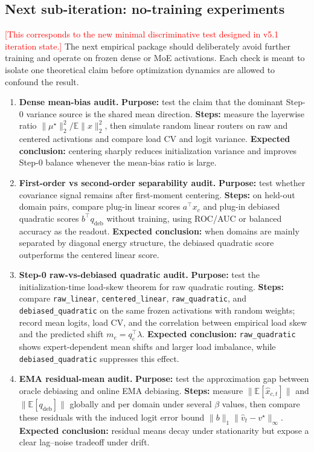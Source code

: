\documentclass[11pt]{article}
\newcommand{\idea}[1]{\textcolor{red}{[#1]}}
\begin{document}
\subsection{Next sub-iteration: no-training experiments}
\idea{This corresponds to the new minimal discriminative test designed in v5.1 iteration state.}
The next empirical package should deliberately avoid further training and operate on frozen dense or MoE activations. Each check is meant to isolate one theoretical claim before optimization dynamics are allowed to confound the result.
\begin{enumerate}
    \item \textbf{Dense mean-bias audit.} \textbf{Purpose:} test the claim that the dominant Step-0 variance source is the shared mean direction. \textbf{Steps:} measure the layerwise ratio $\|\mu^\star\|_2^2/\mathbb E\|x\|_2^2$, then simulate random linear routers on raw and centered activations and compare load CV and logit variance. \textbf{Expected conclusion:} centering sharply reduces initialization variance and improves Step-0 balance whenever the mean-bias ratio is large.
    \item \textbf{First-order vs second-order separability audit.} \textbf{Purpose:} test whether covariance signal remains after first-moment centering. \textbf{Steps:} on held-out domain pairs, compare plug-in linear scores $a^\top x_c$ and plug-in debiased quadratic scores $b^\top q_{\mathrm{deb}}$ without training, using ROC/AUC or balanced accuracy as the readout. \textbf{Expected conclusion:} when domains are mainly separated by diagonal energy structure, the debiased quadratic score outperforms the centered linear score.
    \item \textbf{Step-0 raw-vs-debiased quadratic audit.} \textbf{Purpose:} test the initialization-time load-skew theorem for raw quadratic routing. \textbf{Steps:} compare \texttt{raw\_linear}, \texttt{centered\_linear}, \texttt{raw\_quadratic}, and \texttt{debiased\_quadratic} on the same frozen activations with random weights; record mean logits, load CV, and the correlation between empirical load skew and the predicted shift $m_e=q_e^\top \lambda$. \textbf{Expected conclusion:} \texttt{raw\_quadratic} shows expert-dependent mean shifts and larger load imbalance, while \texttt{debiased\_quadratic} suppresses this effect.
    \item \textbf{EMA residual-mean audit.} \textbf{Purpose:} test the approximation gap between oracle debiasing and online EMA debiasing. \textbf{Steps:} measure $\|\mathbb E[\hat x_{c,t}]\|$ and $\|\mathbb E[q_{\mathrm{deb}}]\|$ globally and per domain under several $\beta$ values, then compare these residuals with the induced logit error bound $\|b\|_1\|\hat v_t-v^\star\|_\infty$. \textbf{Expected conclusion:} residual means decay under stationarity but expose a clear lag--noise tradeoff under drift.

\end{enumerate}
\end{document}
